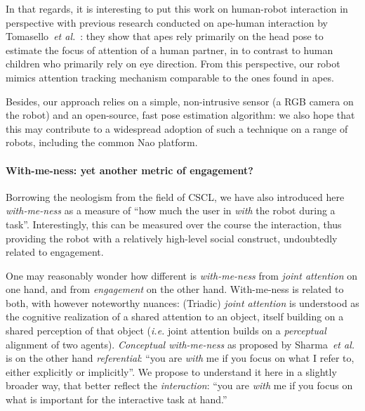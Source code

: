 \documentclass{sig-alternate}
\newcommand{\etal}{\textit{et al.}\xspace}
\newcommand{\ie}{\textit{i.e.}\xspace}
\begin{document}
In that regards, it is interesting to put this work on human-robot interaction
in perspective with previous research conducted on ape-human interaction by
Tomasello~\etal~\cite{tomasello2007reliance}: they show that apes rely primarily
on the head pose to estimate the focus of attention of a human partner, in to contrast
to human children who primarily rely on eye direction. From this perspective,
our robot mimics attention tracking mechanism comparable to the ones found in apes.

Besides, our approach relies on a simple, non-intrusive sensor (a RGB camera on
the robot) and an open-source, fast pose estimation algorithm: we also hope that this may contribute to a widespread
adoption of such a technique on a range of robots, including the common {\sc
Nao} platform.


\paragraph{With-me-ness: yet another metric of engagement?}

Borrowing the neologism from the field of CSCL, we have also introduced here
\emph{with-me-ness} as a measure of ``how much the user in \emph{with} the robot during
a task''. Interestingly, this can be measured over the course the interaction,
thus providing the robot with a relatively high-level social construct,
undoubtedly related to engagement.

One may reasonably wonder how different is \emph{with-me-ness} from \emph{joint
attention} on one hand, and from \emph{engagement} on the other hand.
With-me-ness is related to both, with however noteworthy nuances: (Triadic) \emph{joint
attention} is understood as the cognitive realization of a shared attention to
an object, itself building on a shared perception of that object (\ie joint attention
builds on a \emph{perceptual} alignment of two agents). \emph{Conceptual
with-me-ness} as proposed by Sharma~\etal is on the other hand \emph{referential}: ``you are
\emph{with} me if you focus on what I refer to, either explicitly or
implicitly''. We propose to understand it here in a slightly broader way, that
better reflect the \emph{interaction}: ``you are \emph{with} me if you focus on
what is important for the interactive task at hand.''
\end{document}
